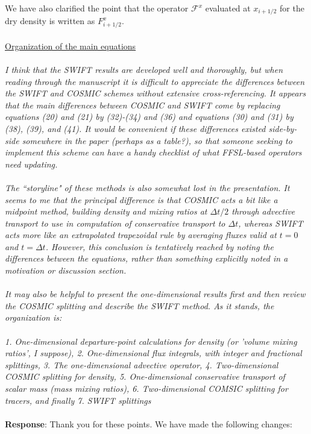 \documentclass[11pt,a4paper]{article}
\begin{document}
We have also clarified the point that the operator $\mathcal{F}^{x}$ evaluated at $x_{i+1/2}$ for the dry density is written as $F^x_{i+1/2}$.
\\
\\
\underline{Organization of the main equations} \\
\\
\textit{I think that the SWIFT results are developed well and thoroughly, but when reading through the manuscript it is difficult to appreciate the differences between the SWIFT and COSMIC schemes without extensive cross-referencing.  It appears that the main differences between COSMIC and SWIFT come by replacing equations (20) and (21) by (32)-(34) and (36) and equations (30) and (31) by (38), (39), and (41).  It would be convenient if these differences existed side-by-side somewhere in the paper (perhaps as a table?), so that someone seeking to implement this scheme can have a handy checklist of what FFSL-based operators need updating. \\
\\
The ``storyline" of these methods is also somewhat lost in the presentation.  It seems to me that the principal difference is that COSMIC acts a bit like a midpoint method, building density and mixing ratios at $\Delta t/2$ through advective transport to use in computation of conservative transport to $\Delta t$, whereas SWIFT acts more like an extrapolated trapezoidal rule by averaging fluxes valid at $t=0$ and $t=\Delta t$.  However, this conclusion is tentatively reached by noting the differences between the equations, rather than something explicitly noted in a motivation or discussion section. \\
\\
It may also be helpful to present the one-dimensional results first and then review the COSMIC splitting and describe the SWIFT method.  As it stands, the organization is: \\
\\
1. One-dimensional departure-point calculations for density (or 'volume mixing ratios', I suppose), 2. One-dimensional flux integrals, with integer and fractional splittings, 3. The one-dimensional advective operator, 4. Two-dimensional COSMIC splitting for density, 5. One-dimensional conservative transport of scalar mass (mass mixing ratios), 6. Two-dimensional COMSIC splitting for tracers, and finally 7. SWIFT splittings} \\
\\
\textbf{Response}: Thank you for these points. We have made the following changes:
\end{document}
